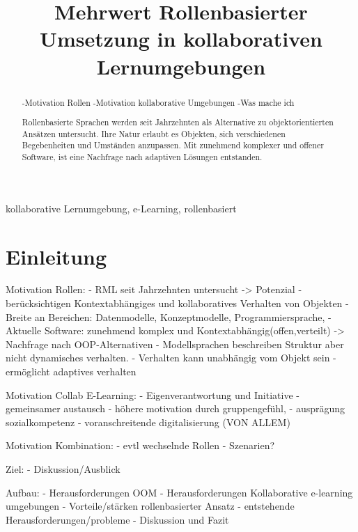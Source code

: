 \documentclass[conference]{IEEEtran}
\begin{document}
\title{Mehrwert Rollenbasierter Umsetzung in kollaborativen Lernumgebungen\\}


\author{
}



\maketitle

\begin{abstract}
-Motivation Rollen 
-Motivation kollaborative Umgebungen
-Was mache ich 

Rollenbasierte Sprachen werden seit Jahrzehnten als Alternative zu objektorientierten Ansätzen untersucht. Ihre Natur erlaubt es Objekten, sich verschiedenen Begebenheiten und Umständen anzupassen. Mit zunehmend komplexer und offener Software, ist eine Nachfrage nach adaptiven Lösungen entstanden. 
\end{abstract}

\begin{IEEEkeywords}
kollaborative Lernumgebung, e-Learning, rollenbasiert
\end{IEEEkeywords}

\section{Einleitung}
Motivation Rollen:
- RML seit Jahrzehnten untersucht -> Potenzial
- berücksichtigen Kontextabhängiges und kollaboratives Verhalten von Objekten
- Breite an Bereichen: Datenmodelle, Konzeptmodelle, Programmiersprache,
- Aktuelle Software: zunehmend komplex und Kontextabhängig(offen,verteilt) -> Nachfrage nach OOP-Alternativen
- Modellsprachen beschreiben Struktur aber nicht dynamisches verhalten.
- Verhalten kann unabhängig vom Objekt sein
- ermöglicht adaptives verhalten

Motivation  Collab E-Learning:
- Eigenverantwortung und Initiative
- gemeinsamer austausch
- höhere motivation durch gruppengefühl, 
- ausprägung sozialkompetenz
- voranschreitende digitalisierung (VON ALLEM) 

Motivation Kombination:
- evtl wechselnde Rollen
- Szenarien? 

Ziel:
- Diskussion/Ausblick

Aufbau:
- Herausforderungen OOM
- Herausforderungen Kollaborative e-learning umgebungen
- Vorteile/stärken rollenbasierter Ansatz
- entstehende Herausforderungen/probleme
- Diskussion und Fazit
\end{document}
